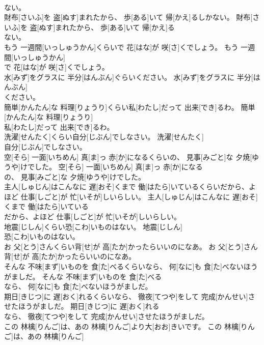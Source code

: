\documentclass[8pt]{extreport}
\begin{document}
\begin{CJK}{UTF8}{min}
\\	ない。	
\\	財布[さいふ]を 盗[ぬす]まれたから、 歩[ある]いて 帰[かえ]るしかない。	財布[さいふ]を 盗[ぬす]まれたから、 歩[ある]いて 帰[かえ]る
\\	ない。	
\\	もう 一週間[いっしゅうかん]くらいで 花[はな]が 咲[さ]くでしょう。	もう 一週間[いっしゅうかん]
\\	で 花[はな]が 咲[さ]くでしょう。	
\\	水[みず]をグラスに 半分[はんぶん]ぐらいください。	水[みず]をグラスに 半分[はんぶん]
\\	ください。	
\\	簡単[かんたん]な 料理[りょうり]くらい私[わたし]だって 出来[でき]るわ。	簡単[かんたん]な 料理[りょうり]
\\	私[わたし]だって 出来[でき]るわ。	
\\	洗濯[せんたく]くらい自分[じぶん]でしなさい。	洗濯[せんたく]
\\	自分[じぶん]でしなさい。	
\\	空[そら] 一面[いちめん] 真[ま]っ 赤[か]になるくらいの、 見事[みごと]な 夕焼[ゆうや]けでした。	空[そら] 一面[いちめん] 真[ま]っ 赤[か]になる
\\	の、 見事[みごと]な 夕焼[ゆうや]けでした。	
\\	主人[しゅじん]はこんなに 遅[おそ]くまで 働[はたら]いているくらいだから、よほど 仕事[しごと]が 忙[いそが]しいらしい。	主人[しゅじん]はこんなに 遅[おそ]くまで 働[はたら]いている
\\	だから、よほど 仕事[しごと]が 忙[いそが]しいらしい。	
\\	地震[じしん]くらい恐[こわ]いものはない。	地震[じしん]
\\	恐[こわ]いものはない。	
\\	お 父[とう]さんくらい背[せ]が 高[たか]かったらいいのになあ。	お 父[とう]さん
\\	背[せ]が 高[たか]かったらいいのになあ。	
\\	そんな 不味[まず]いものを 食[た]べるくらいなら、 何[なに]も 食[た]べないほうがましだ。	そんな 不味[まず]いものを 食[た]べる
\\	なら、 何[なに]も 食[た]べないほうがましだ。	
\\	期日[きじつ]に 遅[おく]れるくらいなら、 徹夜[てつや]をして 完成[かんせい]させたほうがましだ。	期日[きじつ]に 遅[おく]れる
\\	なら、 徹夜[てつや]をして 完成[かんせい]させたほうがましだ。	
\\	この 林檎[りんご]は、あの 林檎[りんご]より大[おお]きいです。	この 林檎[りんご]は、あの 林檎[りんご]

\end{CJK}
\end{document}
